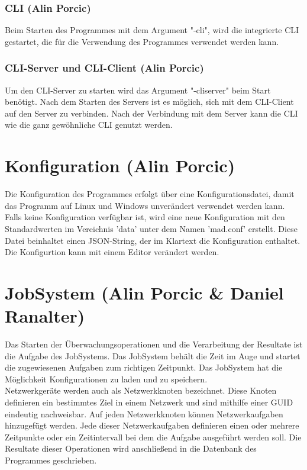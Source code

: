 \documentclass[12pt,a4paper]{report}
\begin{document}
\subsection{CLI (Alin Porcic)}

Beim Starten des Programmes mit dem Argument "-cli", wird die integrierte CLI gestartet, die für die Verwendung des Programmes verwendet werden kann.

\subsection{CLI-Server und CLI-Client (Alin Porcic)}

Um den CLI-Server zu starten wird das Argument "-cliserver" beim Start benötigt. Nach dem Starten des Servers ist es möglich, sich mit dem CLI-Client auf den Server zu verbinden. Nach der Verbindung mit dem Server kann die CLI wie die ganz gewöhnliche CLI genutzt werden.

\chapter{Konfiguration (Alin Porcic)}

Die Konfiguration des Programmes erfolgt über eine Konfigurationsdatei, damit das Programm auf Linux und Windows unverändert verwendet werden kann. Falls keine Konfiguration verfügbar ist, wird eine neue Konfiguration mit den Standardwerten im Vereichnis 'data' unter dem Namen 'mad.conf' erstellt. Diese Datei  beinhaltet einen JSON-String, der im Klartext die Konfiguration enthaltet. Die Konfigurtion kann mit einem Editor verändert werden.

\chapter{JobSystem (Alin Porcic \& Daniel Ranalter)}

Das Starten der Überwachungsoperationen und die Verarbeitung der Resultate ist die Aufgabe des JobSystems. Das JobSystem behält die Zeit im Auge und startet die zugewiesenen Aufgaben zum richtigen Zeitpunkt. Das JobSystem hat die Möglichkeit Konfigurationen zu laden und zu speichern.\\
Netzwerkgeräte werden auch als Netzwerkknoten bezeichnet. Diese Knoten definieren ein bestimmtes Ziel in einem Netzwerk und sind mithilfe einer GUID eindeutig nachweisbar. Auf jeden Netzwerkknoten können Netzwerkaufgaben hinzugefügt werden. Jede dieser Netzwerkaufgaben definieren einen oder mehrere Zeitpunkte oder ein Zeitintervall bei dem die Aufgabe ausgeführt werden soll. Die Resultate dieser Operationen wird anschließend in die Datenbank des Programmes geschrieben.
\end{document}
